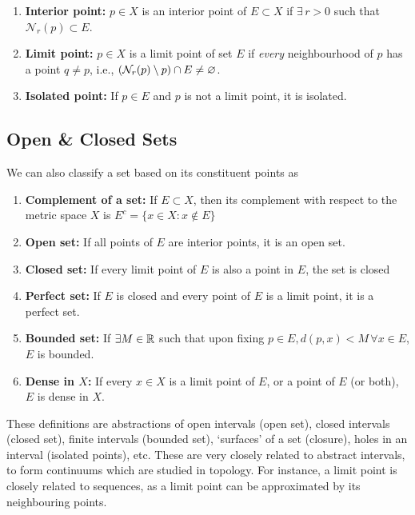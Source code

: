 \begin{enumerate}[label=D\arabic*.]
\item \textbf{Interior point:} $p\in X$ is an interior point of $E\subset X$ if $\exists\,r>0$ such that $\mathcal{N}_r(p)\subset E$.
\item \textbf{Limit point:} $p\in X$ is a limit point of set $E$ if \textit{every} neighbourhood of $p$ has a point $q\neq p$, i.e., $\left(\mathcal{N}_r(p)\setminus {p}\right) \cap E \neq \varnothing$.
\item \textbf{Isolated point:} If $p\in E$ and $p$ is not a limit point, it is isolated.
\end{enumerate}

\subsection{Open \& Closed Sets}
We can also classify a set based on its constituent points as
\begin{enumerate}[label=S\arabic*.]
\item \textbf{Complement of a set:} If $E\subset X$, then its complement with respect to the metric space $X$ is $E^c=\{x\in X:x\notin E\}$
\item \textbf{Open set:} If all points of $E$ are interior points, it is an open set.
\item \textbf{Closed set:} If every limit point of $E$ is also a point in $E$, the set is closed
\item \textbf{Perfect set:} If $E$ is closed and every point of $E$ is a limit point, it is a perfect set.
\item \textbf{Bounded set:} If $\exists M\in \mathbb{R}$ such that upon fixing $p\in E, d(p,x)<M\,\forall x\in E$, $E$ is bounded.
\item \textbf{Dense in $X$:}  If every $x\in X$ is a limit point of $E$, or a point of $E$ (or both), $E$ is dense in $X$.
\end{enumerate}

These definitions are abstractions of open intervals (open set), closed intervals (closed set), finite intervals (bounded set), `surfaces' of a set (closure), holes in an interval (isolated points), etc. These are very closely related to abstract intervals, to form continuums which are studied in topology. For instance, a limit point is closely related to sequences, as a limit point can be approximated by its neighbouring points.

